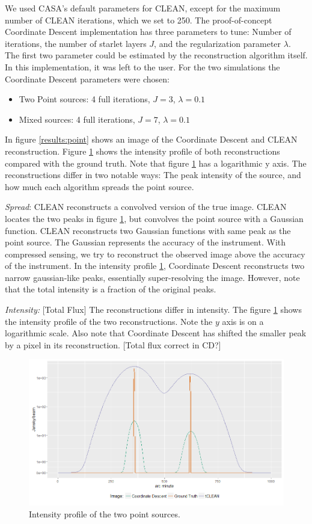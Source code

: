 We used CASA's default parameters for CLEAN, except for the maximum number of CLEAN iterations, which we set to 250. The proof-of-concept Coordinate Descent implementation has three parameters to tune: Number of iterations, the number of starlet layers $J$, and the regularization parameter $\lambda$. The first two parameter could be estimated by the reconstruction algorithm itself. In this implementation, it was left to the user. For the two simulations the Coordinate Descent parameters were chosen:
\begin{itemize}
	\item Two Point sources: 4 full iterations, $J=3$, $\lambda=0.1$
	\item Mixed sources: 4 full iterations, $J=7$, $\lambda=0.1$
\end{itemize}

In figure \ref{results:point} shows an image of the Coordinate Descent and CLEAN reconstruction. Figure \ref{results:points:contour} shows the intensity profile of both reconstructions compared with the ground truth. Note that figure \ref{results:points:contour} has a logarithmic y axis. The reconstructions differ in two notable ways: The peak intensity of the source, and how much each algorithm spreads the point source. 

\textit{Spread}: CLEAN reconstructs a convolved version of the true image. CLEAN locates the two peaks in figure \ref{results:points:contour}, but convolves the point source with a Gaussian function. CLEAN reconstructs two Gaussian functions with same peak as the point source. The Gaussian represents the accuracy of the instrument. With compressed sensing, we try to reconstruct the observed image above the accuracy of the instrument. In the intensity profile \ref{results:points:contour}, Coordinate Descent reconstructs two narrow gaussian-like peaks, essentially super-resolving the image. However, note that the total intensity is a fraction of the original peaks.

\textit{Intensity:} [Total Flux] The reconstructions differ in intensity. The figure \ref{results:points:contour} shows the intensity profile of the two reconstructions. Note the $y$ axis is on a logarithmic scale. Also note that Coordinate Descent has shifted the smaller peak by a pixel in its reconstruction. [Total flux correct in CD?]

\begin{figure}[h]
	\centering
	\includegraphics[width=0.8\linewidth]{./chapters/20.results/points/line.png}
	\caption{Intensity profile of the two point sources.}
	\label{results:points:contour}
\end{figure}

